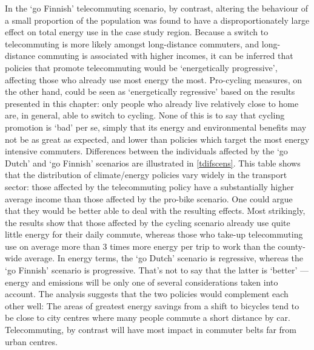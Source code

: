In the `go Finnish' telecommuting scenario, by contrast, altering the
behaviour of a small proportion of the population was found to have a
disproportionately large effect on total energy use in the case study region.
Because a switch to telecommuting is more likely amongst long-distance commuters,
and long-distance commuting is associated with higher incomes, it
can be inferred that policies that promote telecommuting would be
`energetically progressive', affecting those who already use most energy the most.
Pro-cycling measures, on the other hand, could be seen as `energetically
regressive' based on the results presented in this chapter: only people
who already live relatively close to home are, in general, able to switch to
cycling. None of this is to say that cycling promotion is `bad' per se,
simply that its energy and environmental benefits may not be as great as
expected, and lower than policies which target the most energy intensive
commuters. Differences between the individuals affected by the `go Dutch'
and `go Finnish' scenarios are illustrated in \cref{tdifscens}. This table
shows that the distribution of climate/energy policies vary widely in
the transport sector: those affected by the telecommuting policy have
a substantially higher average income than those affected by the pro-bike
scenario. One could argue that they would be better able to deal with the
resulting effects. Most strikingly, the results show that those affected
by the cycling scenario already use quite little energy for their daily commute,
whereas those who take-up telecommuting use on average more than 3 times more
energy per trip to work than the county-wide average. In energy terms,
the `go Dutch' scenario is regressive, whereas the `go Finnish' scenario is
progressive. That's not to say that the latter is `better' --- energy and
emissions will be only one of several considerations taken into account.
The analysis suggests that the two policies would complement each other well:
The areas of greatest energy savings from a shift to bicycles tend to be close
to city centres where many people commute a short distance by car.
Telecommuting, by contrast will have most impact in commuter belts far from
urban centres.

